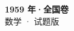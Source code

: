 \documentclass[zihao=-4, a4paper]{ctexart}
\begin{document}
\begin{center}
  {\Large\bfseries 1959 年·全国卷}\\[4pt]
  {\large 数学 · 试题版}
\end{center}
\medskip
{}

\end{document}
